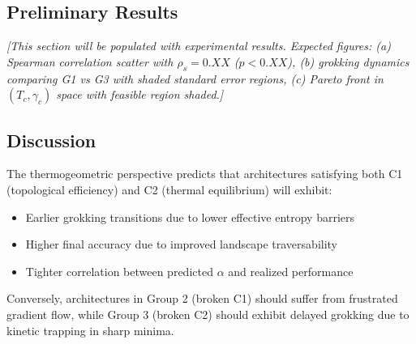 \subsection{Preliminary Results}
\label{sec:preliminary_results}

\textit{[This section will be populated with experimental results. Expected 
figures: (a) Spearman correlation scatter with $\rho_s = 0.XX$ ($p < 0.XX$), 
(b) grokking dynamics comparing G1 vs G3 with shaded standard error regions, 
(c) Pareto front in $(T_c, \gamma_c)$ space with feasible region shaded.]}

\subsection{Discussion}
\label{sec:discussion}

The thermogeometric perspective predicts that architectures satisfying both 
C1 (topological efficiency) and C2 (thermal equilibrium) will exhibit:
\begin{itemize}
  \item Earlier grokking transitions due to lower effective entropy barriers
  \item Higher final accuracy due to improved landscape traversability  
  \item Tighter correlation between predicted $\alpha$ and realized performance
\end{itemize}

Conversely, architectures in Group 2 (broken C1) should suffer from 
frustrated gradient flow, while Group 3 (broken C2) should exhibit delayed 
grokking due to kinetic trapping in sharp minima.

